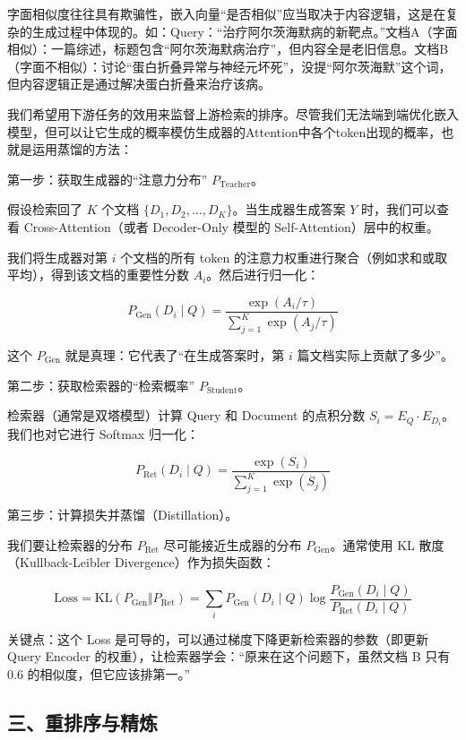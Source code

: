 字面相似度往往具有欺骗性，嵌入向量``是否相似''应当取决于内容逻辑，这是在复杂的生成过程中体现的。如：Query：``治疗阿尔茨海默病的新靶点。''文档A（字面相似）：一篇综述，标题包含``阿尔茨海默病治疗''，但内容全是老旧信息。文档B（字面不相似）：讨论``蛋白折叠异常与神经元坏死''，没提``阿尔茨海默''这个词，但内容逻辑正是通过解决蛋白折叠来治疗该病。

我们希望用下游任务的效用来监督上游检索的排序。尽管我们无法端到端优化嵌入模型，但可以让它生成的概率模仿生成器的Attention中各个token出现的概率，也就是运用蒸馏的方法：

第一步：获取生成器的``注意力分布'' \(P_{\mathrm{Teacher}}\)。

假设检索回了 \(K\) 个文档 \(\{D_1,D_2,\ldots,D_K\}\)。当生成器生成答案 \(Y\) 时，我们可以查看 Cross-Attention（或者 Decoder-Only 模型的 Self-Attention）层中的权重。

我们将生成器对第 \(i\) 个文档的所有 token 的注意力权重进行聚合（例如求和或取平均），得到该文档的重要性分数 \(A_i\)。然后进行归一化：

\[
P_{\mathrm{Gen}}(D_i\mid Q)=\frac{\exp(A_i/\tau)}{\sum_{j=1}^{K}\exp(A_j/\tau)}
\]

这个 \(P_{\mathrm{Gen}}\) 就是真理：它代表了``在生成答案时，第 \(i\) 篇文档实际上贡献了多少''。

第二步：获取检索器的``检索概率'' \(P_{\mathrm{Student}}\)。

检索器（通常是双塔模型）计算 Query 和 Document 的点积分数 \(S_i=E_Q\cdot E_{D_i}\)。我们也对它进行 Softmax 归一化：

\[
P_{\mathrm{Ret}}(D_i\mid Q)=\frac{\exp(S_i)}{\sum_{j=1}^{K}\exp(S_j)}
\]

第三步：计算损失并蒸馏（Distillation）。

我们要让检索器的分布 \(P_{\mathrm{Ret}}\) 尽可能接近生成器的分布 \(P_{\mathrm{Gen}}\)。通常使用 KL 散度（Kullback-Leibler Divergence）作为损失函数：

\[
\mathrm{Loss}=\mathrm{KL}(P_{\mathrm{Gen}}\Vert P_{\mathrm{Ret}})=\sum_i P_{\mathrm{Gen}}(D_i\mid Q)\log\frac{P_{\mathrm{Gen}}(D_i\mid Q)}{P_{\mathrm{Ret}}(D_i\mid Q)}
\]

关键点：这个 Loss 是可导的，可以通过梯度下降更新检索器的参数（即更新 Query Encoder 的权重），让检索器学会：``原来在这个问题下，虽然文档 B 只有 \(0.6\) 的相似度，但它应该排第一。''

\hypertarget{ux4e09ux91cdux6392ux5e8fux4e0eux7cbeux70bc}{%
\subsection{三、重排序与精炼}\label{ux4e09ux91cdux6392ux5e8fux4e0eux7cbeux70bc}}

